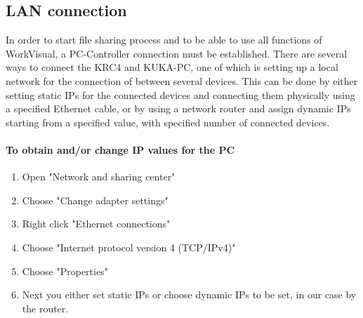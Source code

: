 			\subsection{LAN connection}
			In order to start file sharing process and to be able to use all functions of WorkVisual, a PC-Controller connection must be established. There are several ways to connect the KRC4 and KUKA-PC, one of which is setting up a local network for the connection of between several devices. This can be done by either setting static IPs for the connected devices and connecting them physically using a specified Ethernet cable, or by using a network router and assign dynamic IPs starting from a specified value, with specified number of connected devices. 
			\newline	
			\paragraph{To obtain and/or change IP values for the PC}
			\begin{enumerate}
				\item Open "Network and sharing center" 
				\item Choose "Change adapter settings"
				\item Right click "Ethernet connections"
				\item  Choose "Internet protocol version 4 (TCP/IPv4)"
				\item  Choose "Properties"
				\item Next you either set static IPs or choose dynamic IPs to be set, in our case by the router.
			\end{enumerate}
			
			
